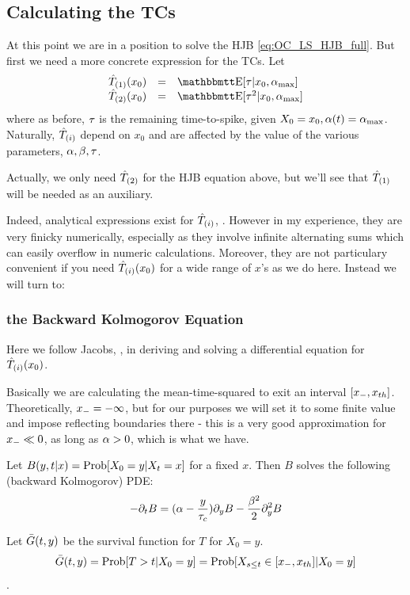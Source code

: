 \documentclass{article}
\begin{document}
\subsection{Calculating the TCs} 
\label{sec:calculating_TCs}
At this point we are in a position to solve the HJB \cref{eq:OC_LS_HJB_full}.
But first we need a more concrete expression for the TCs. Let
\begin{equation}
\begin{array}{lcl}
\Tone(x_0) &=& \Exp[\t|x_0, \amax] 
\\
\Ttwo(x_0) &=& \Exp[\t^2|x_0, \amax]  
\end{array}
\end{equation}
where as before, ${\tau}$ is the remaining time-to-spike, given $X_0 = x_0, {\alpha}(t) =
{ {\alpha}_{\textrm{max}} }$. Naturally, ${ \hat{T}_{(i)} }$ depend on $x_0$ and are affected by the value of the
various parameters, ${\alpha},{\beta},{\tau}$. 

Actually, we only  need ${ \hat{T}_{(2)} }$ for the HJB equation above, but we'll see that
${ \hat{T}_{(1)} }$ will be needed as an auxiliary.

Indeed, analytical expressions exist for ${ \hat{T}_{(i)} }$, \cite{Inoue1995}. However in my
experience, they are very finicky numerically, especially as they involve
infinite alternating sums which can easily overflow in numeric calculations.
Moreover, they are not particulary convenient if you need ${ \hat{T}_{(i)} } (x_0)$ for a wide
range of $x$'s as we do here. Instead we will turn to:

\subsubsection{the Backward Kolmogorov Equation}
Here we follow Jacobs, \cite{Jacobs}, in deriving and solving a differential
equation for ${ \hat{T}_{(i)} }(x_0)$.

Basically we are calculating the mean-time-squared to exit an interval $[{ x_{-} },
{ x_{th} }]$. Theoretically, ${ x_{-} } = -\infty$, but for our purposes we will set it to
some finite value and impose reflecting boundaries there - this is a very good
approximation for ${ x_{-} } \ll 0$, as long as ${\alpha}>0$, which is what we have. 

Let $B(y,t|x) = \operatorname{Prob}[X_0 = y| X_t = x]$ for a fixed $x$. Then $B$ solves the
following (backward Kolmogorov) PDE:
\begin{equation}
-{\partial}_t B = ({\alpha} - \frac y{{ \tau_{c} }}){\partial}_yB - \frac {{\beta}^2} 2 {\partial}_y^2 B
\label{eq:backward_Xdensity}
\end{equation}

Let ${ \bar{G} }(t,y)$ be the survival function for $T$ for $X_0 = y$. 
$${ \bar{G} }(t,y) = \operatorname{Prob}[T>t | X_0 = y] = \operatorname{Prob}[X_{s\leq t} \in [{ x_{-} },
{ x_{th} }] | X_0 = y]$$.
\end{document}
